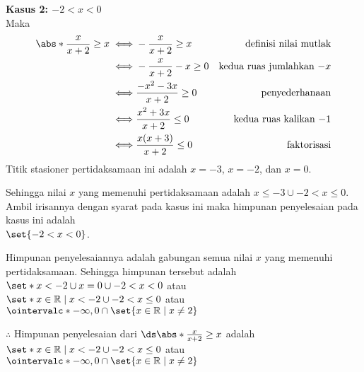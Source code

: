 \begin{enumerate}[leftmargin=*, label={\arabic*}.]
\begin{enumerate}[label={\alph*}.]
\textbf{Kasus 2: $-2 < x < 0$}\\
Maka
\begin{align*}
    \abs*{\frac{x}{x+2}} \geq x
    \iff &-\frac{x}{x+2} \geq x
    &\text{definisi nilai mutlak} \\
    \iff &-\frac{x}{x+2} -x \geq 0
    &\text{kedua ruas jumlahkan $-x$}\\
    \iff &\frac{-x^{2}-3x}{x+2} \geq 0
    &\text{penyederhanaan}\\
    \iff &\frac{x^{2}+3x}{x+2} \leq 0
    &\text{kedua ruas kalikan $-1$}\\
    \iff &\frac{x(x+3)}{x+2} \leq 0
    &\text{faktorisasi}\\
\end{align*}
Titik stasioner pertidaksamaan ini adalah $x=-3$, $x=-2$, dan $x=0$.
\begin{center}
\end{center}
Sehingga nilai $x$ yang memenuhi pertidaksamaan adalah $x \leq -3 \cup -2 < x \leq 0$. Ambil 
irisannya dengan syarat pada kasus ini maka himpunan penyelesaian pada kasus ini adalah 
\\$\set{-2 < x < 0}$. 

Himpunan penyelesaiannya adalah gabungan semua nilai $x$ yang memenuhi pertidaksamaan. 
Sehingga himpunan tersebut adalah 
$\set*{x < -2 \cup x = 0 \cup -2 < x < 0}$ 
atau \\
$\set*{x \in \mathbb{R} \mid x < -2 \cup -2 < x \leq 0}$
atau
$\ointervalc*{-\infty,0} \cap \set{x \in \mathbb{R} \mid x \neq 2}$

$\therefore$ Himpunan penyelesaian dari 
$\ds \abs*{\frac{x}{x+2}} \geq x$ adalah 
$\set*{x \in \mathbb{R} \mid x < -2 \cup -2 < x \leq 0}$
atau \\
$\ointervalc*{-\infty,0} \cap \set{x \in \mathbb{R} \mid x \neq 2}$


\end{enumerate}
\end{enumerate}
